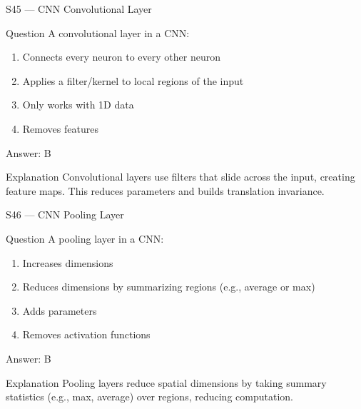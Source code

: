 \documentclass[aspectratio=169,8pt]{beamer}
\begin{document}
	\begin{frame}{S45 --- CNN Convolutional Layer}
		\begin{block}{Question}
			A convolutional layer in a CNN:
			\begin{enumerate}
				\item Connects every neuron to every other neuron
				\item Applies a filter/kernel to local regions of the input
				\item Only works with 1D data
				\item Removes features
			\end{enumerate}
		\end{block}
		\begin{exampleblock}{Answer: B}\end{exampleblock}
		\begin{block}{Explanation}
			Convolutional layers use filters that slide across the input, creating feature maps. This reduces parameters and builds translation invariance.
		\end{block}
	\end{frame}
	
	\begin{frame}{S46 --- CNN Pooling Layer}
		\begin{block}{Question}
			A pooling layer in a CNN:
			\begin{enumerate}
				\item Increases dimensions
				\item Reduces dimensions by summarizing regions (e.g., average or max)
				\item Adds parameters
				\item Removes activation functions
			\end{enumerate}
		\end{block}
		\begin{exampleblock}{Answer: B}\end{exampleblock}
		\begin{block}{Explanation}
			Pooling layers reduce spatial dimensions by taking summary statistics (e.g., max, average) over regions, reducing computation.
		\end{block}
	\end{frame}
	
\end{document}
